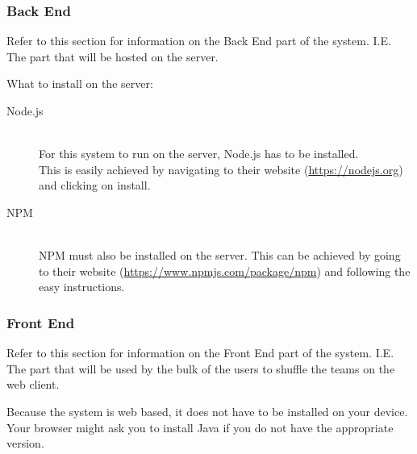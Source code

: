 \subsubsection{Back End}
	Refer to this section for information on the Back End part of the system. I.E. The part that will be hosted on the server.\par
	\vspace{0.3cm}
	
What to install on the server:
\begin{description} 
\item[Node.js] \hfill 
\\ For this system to run on the server, Node.js has to be installed.
\\ This is easily achieved by navigating to their website (\href{https://nodejs.org}{https://nodejs.org}) and clicking on install. 
\item[NPM] \hfill 
\\ NPM must also be installed on the server.  This can be achieved by going to their website  (\href{https://www.npmjs.com/package/npm}{https://www.npmjs.com/package/npm}) and following the easy instructions. 
\end{description}

\subsubsection{Front End}
	Refer to this section for information on the Front End part of the system. I.E. The part that will be 	used by the bulk of the users to shuffle the teams on the web client.\par
	\vspace{0.3cm}
	
Because the system is web based, it does not have to be installed on your device. 
Your browser might ask you to install Java if you do not have the appropriate version.